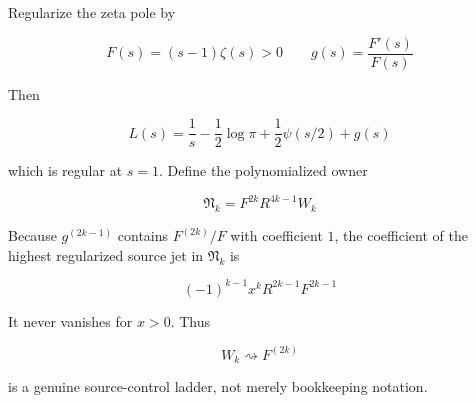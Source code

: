 \documentclass[
  11pt,
]{book}
\begin{document}
Regularize the zeta pole by

\[
F(s)=(s-1)\zeta(s)>0
\qquad
g(s)=\frac{F'(s)}{F(s)}
\]

Then

\[
L(s)=\frac1s-\frac12\log\pi
+\frac12\psi(s/2)+g(s)
\]

which is regular at \(s=1\). Define the polynomialized owner

\[
\mathfrak N_k=F^{2k}R^{4k-1}W_k
\]

Because \(g^{(2k-1)}\) contains \(F^{(2k)}/F\) with coefficient \(1\),
the coefficient of the highest regularized source jet in
\(\mathfrak N_k\) is

\[
\boxed{
(-1)^{k-1}x^kR^{2k-1}F^{2k-1}
}
\tag{34.3}
\]

It never vanishes for \(x>0\). Thus

\[
\boxed{W_k\rightsquigarrow F^{(2k)}}
\tag{34.4}
\]

is a genuine source-control ladder, not merely bookkeeping notation.
\end{document}
